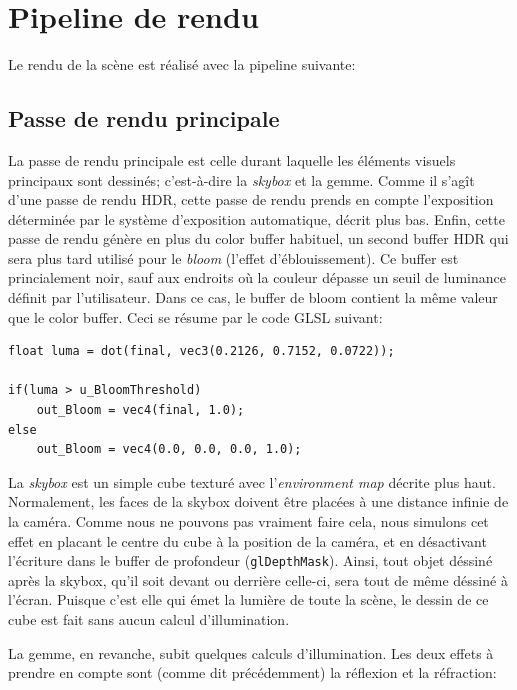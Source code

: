 \documentclass[a4paper,12pt]{article}
\newcommand{\svg}[2][0cm]{
    \begin{figure}[H]
        \centering
        \def\svgwidth{\columnwidth - #1}
        
    \end{figure}
}
\begin{document}
\section{Pipeline de rendu}
Le rendu de la scène est réalisé avec la pipeline suivante:
\svg{PipelineDeRendu}

\subsection{Passe de rendu principale}
La passe de rendu principale est celle durant laquelle les éléments visuels principaux sont dessinés; c'est-à-dire
la \emph{skybox} et la gemme. Comme il s'agît d'une passe de rendu HDR, cette passe de rendu prends en compte
l'exposition déterminée par le système d'exposition automatique, décrit plus bas. Enfin, cette passe de rendu
génère en plus du color buffer habituel, un second buffer HDR qui sera plus tard utilisé pour le \emph{bloom}
(l'effet d'éblouissement). Ce buffer est princialement noir, sauf aux endroits où la couleur dépasse un
seuil de luminance définit par l'utilisateur. Dans ce cas, le buffer de bloom contient la même valeur que le color
buffer. Ceci se résume par le code GLSL suivant:

\begin{lstlisting}
float luma = dot(final, vec3(0.2126, 0.7152, 0.0722));

if(luma > u_BloomThreshold)
    out_Bloom = vec4(final, 1.0);
else
    out_Bloom = vec4(0.0, 0.0, 0.0, 1.0);
\end{lstlisting}

La \emph{skybox} est un simple cube texturé avec l'\emph{environment map} décrite plus haut. Normalement, les faces
de la skybox doivent être placées à une distance infinie de la caméra. Comme nous ne pouvons pas vraiment faire cela,
nous simulons cet effet en placant le centre du cube à la position de la caméra, et en désactivant l'écriture dans le buffer
de profondeur (\texttt{glDepthMask}). Ainsi, tout objet déssiné après la skybox, qu'il soit devant ou derrière
celle-ci, sera tout de même déssiné à l'écran. Puisque c'est elle qui émet la lumière de toute la scène, le dessin de
ce cube est fait sans aucun calcul d'illumination.

La gemme, en revanche, subit quelques calculs d'illumination. Les deux effets à prendre en compte sont (comme dit précédemment)
la réflexion et la réfraction:
\svg[8cm]{refraction}
\end{document}
